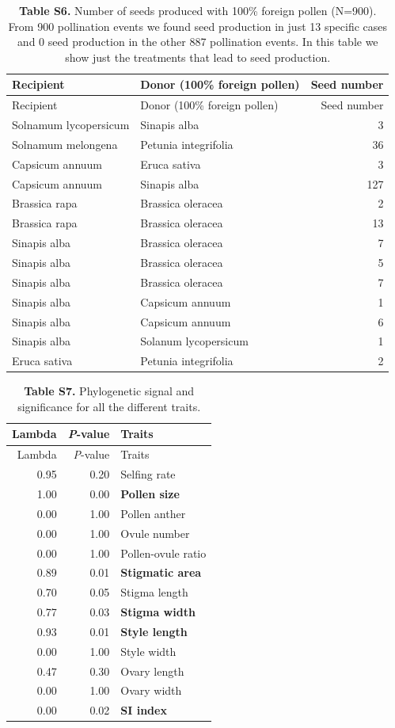 \documentclass[
  12pt,
]{article}
\begin{document}
\begin{longtable}[]{@{}llr@{}}
\caption{\textbf{Table S6.} Number of seeds produced with 100\% foreign
pollen (N=900). From 900 pollination events we found seed production in
just 13 specific cases and 0 seed production in the other 887
pollination events. In this table we show just the treatments that lead
to seed production.}\tabularnewline
\toprule
Recipient & Donor (100\% foreign pollen) & Seed number\tabularnewline
\midrule
\endfirsthead
\toprule
Recipient & Donor (100\% foreign pollen) & Seed number\tabularnewline
\midrule
\endhead
Solnamum lycopersicum & Sinapis alba & 3\tabularnewline
Solnamum melongena & Petunia integrifolia & 36\tabularnewline
Capsicum annuum & Eruca sativa & 3\tabularnewline
Capsicum annuum & Sinapis alba & 127\tabularnewline
Brassica rapa & Brassica oleracea & 2\tabularnewline
Brassica rapa & Brassica oleracea & 13\tabularnewline
Sinapis alba & Brassica oleracea & 7\tabularnewline
Sinapis alba & Brassica oleracea & 5\tabularnewline
Sinapis alba & Brassica oleracea & 7\tabularnewline
Sinapis alba & Capsicum annuum & 1\tabularnewline
Sinapis alba & Capsicum annuum & 6\tabularnewline
Sinapis alba & Solanum lycopersicum & 1\tabularnewline
Eruca sativa & Petunia integrifolia & 2\tabularnewline
\bottomrule
\end{longtable}

\newpage

\begin{longtable}[]{@{}rrl@{}}
\caption{\textbf{Table S7.} Phylogenetic signal and significance for all
the different traits.}\tabularnewline
\toprule
Lambda & \emph{P}-value & Traits\tabularnewline
\midrule
\endfirsthead
\toprule
Lambda & \emph{P}-value & Traits\tabularnewline
\midrule
\endhead
0.95 & 0.20 & Selfing rate\tabularnewline
1.00 & 0.00 & \textbf{Pollen size}\tabularnewline
0.00 & 1.00 & Pollen anther\tabularnewline
0.00 & 1.00 & Ovule number\tabularnewline
0.00 & 1.00 & Pollen-ovule ratio\tabularnewline
0.89 & 0.01 & \textbf{Stigmatic area}\tabularnewline
0.70 & 0.05 & Stigma length\tabularnewline
0.77 & 0.03 & \textbf{Stigma width}\tabularnewline
0.93 & 0.01 & \textbf{Style length}\tabularnewline
0.00 & 1.00 & Style width\tabularnewline
0.47 & 0.30 & Ovary length\tabularnewline
0.00 & 1.00 & Ovary width\tabularnewline
0.00 & 0.02 & \textbf{SI index}\tabularnewline
\bottomrule
\end{longtable}

\newpage
\end{document}
